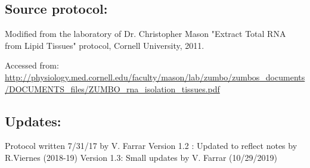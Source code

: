 \documentclass[a4paper,12pt,twoside]{book}
\begin{document}
\begin{enumerate}
 \subsection*{Source protocol:}	
	Modified from the laboratory of Dr. Christopher Mason "Extract Total RNA from Lipid Tissues" protocol, Cornell University, 2011.
	
	Accessed from: \url{http://physiology.med.cornell.edu/faculty/mason/lab/zumbo/zumbos_documents/DOCUMENTS_files/ZUMBO_rna_isolation_tissues.pdf}

 \subsection*{Updates:}
 Protocol written 7/31/17 by V. Farrar
 Version 1.2 : Updated to reflect notes by R.Viernes (2018-19)
 Version 1.3:  Small updates by V. Farrar (10/29/2019)
	
\end{enumerate}
\end{document}
